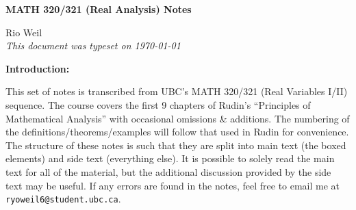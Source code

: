 \documentclass[10pt]{article}
\begin{document}
\begin{tcolorbox}
  \begin{center}
  \begin{Large}
    \textbf{MATH 320/321 (Real Analysis) Notes} \\
    \vspace{5pt}
  \end{Large}
  \begin{large}
        Rio Weil \\
\vspace{5pt}
    \emph{This document was typeset on \today}
  \end{large}
  \end{center}
\end{tcolorbox}

\begin{center}
  \textbf{Introduction:}
  
  This set of notes is transcribed from UBC's MATH 320/321 (Real Variables I/II) sequence. The course covers the first 9 chapters of Rudin's ``Principles of Mathematical Analysis'' with occasional omissions \& additions. The numbering of the definitions/theorems/examples will follow that used in Rudin for convenience. The structure of these notes is such that they are split into main text (the boxed elements) and side text (everything else). It is possible to solely read the main text for all of the material, but the additional discussion provided by the side text may be useful. If any errors are found in the notes, feel free to email me at \texttt{ryoweil6@student.ubc.ca}.
\end{center}

\tableofcontents

\newpage










\end{document}
